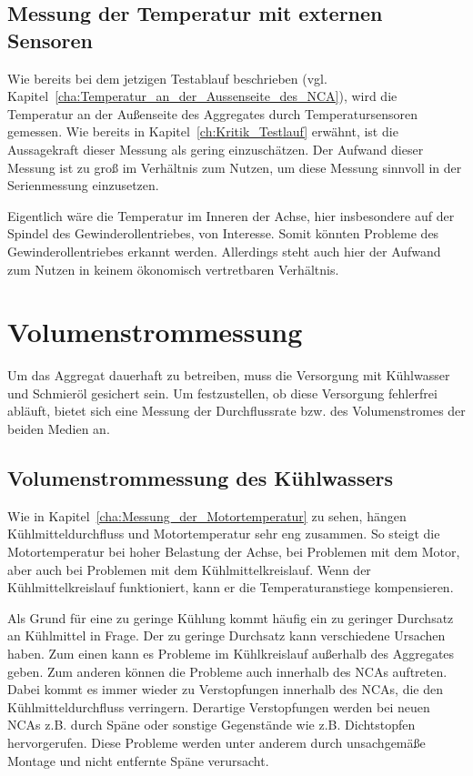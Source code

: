 \subsection{Messung der Temperatur mit externen Sensoren}

Wie bereits bei dem jetzigen Testablauf beschrieben (vgl. Kapitel~\ref{cha:Temperatur_an_der_Aussenseite_des_NCA}), wird die Temperatur an der Außenseite des Aggregates durch Temperatursensoren gemessen. Wie bereits in Kapitel~\ref{ch:Kritik_Testlauf} erwähnt, ist die Aussagekraft dieser Messung als gering einzuschätzen. Der Aufwand dieser Messung ist zu groß im Verhältnis zum Nutzen, um diese Messung sinnvoll in der Serienmessung einzusetzen.


Eigentlich wäre die Temperatur im Inneren der Achse, hier insbesondere auf der Spindel des Gewinderollentriebes, von Interesse. Somit könnten Probleme des Gewinderollentriebes erkannt werden. Allerdings steht auch hier der Aufwand zum Nutzen in keinem ökonomisch vertretbaren Verhältnis.




\section{Volumenstrommessung}

Um das Aggregat dauerhaft zu betreiben, muss die Versorgung mit Kühlwasser und Schmieröl gesichert sein. Um festzustellen, ob diese Versorgung fehlerfrei abläuft, bietet sich eine Messung der Durchflussrate bzw. des Volumenstromes der beiden Medien an.





\subsection{Volumenstrommessung des Kühlwassers}\label{cha:Durchflussmessung_Kühlwasser}



Wie in Kapitel~\ref{cha:Messung_der_Motortemperatur} zu sehen, hängen Kühlmitteldurchfluss und Motortemperatur sehr eng zusammen. So steigt die Motortemperatur bei hoher Belastung der Achse, bei Problemen mit dem Motor, aber auch bei Problemen mit dem Kühlmittelkreislauf. Wenn der Kühlmittelkreislauf funktioniert, kann er die Temperaturanstiege kompensieren.

Als Grund für eine zu geringe Kühlung kommt häufig ein zu geringer Durchsatz an Kühlmittel in Frage. Der zu geringe Durchsatz kann verschiedene Ursachen haben.  Zum einen kann es Probleme im Kühlkreislauf außerhalb des Aggregates geben. Zum anderen können die Probleme auch innerhalb des NCAs auftreten. Dabei kommt es immer wieder zu Verstopfungen innerhalb des NCAs, die den Kühlmitteldurchfluss verringern. Derartige Verstopfungen werden bei neuen NCAs z.B. durch Späne oder sonstige Gegenstände wie z.B. Dichtstopfen hervorgerufen. Diese Probleme werden unter anderem durch unsachgemäße Montage und nicht entfernte Späne verursacht.



